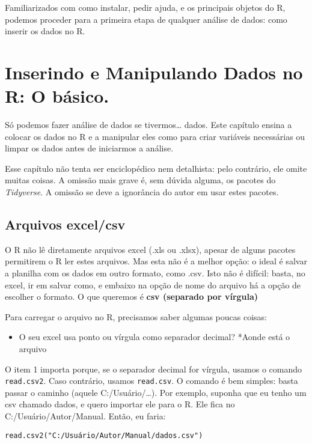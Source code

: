 \documentclass[]{book}
\providecommand{\tightlist}{%
  \setlength{\itemsep}{0pt}\setlength{\parskip}{0pt}}
\begin{document}
Familiarizados com como instalar, pedir ajuda, e os principais objetos
do R, podemos proceder para a primeira etapa de qualquer análise de
dados: como inserir os dados no R.

\chapter{Inserindo e Manipulando Dados no R: O
básico.}\label{inserindo-e-manipulando-dados-no-r-o-basico.}

Só podemos fazer análise de dados se tivermos\ldots{} dados. Este
capítulo ensina a colocar os dados no R e a manipular eles como para
criar variáveis necessárias ou limpar os dados antes de iniciarmos a
análise.

Esse capítulo não tenta ser enciclopédico nem detalhista: pelo
contrário, ele omite muitas coisas. A omissão mais grave é, sem dúvida
alguma, os pacotes do \emph{Tidyverse}. A omissão se deve a ignorância
do autor em usar estes pacotes.

\section{Arquivos excel/csv}\label{arquivos-excelcsv}

O R não lê diretamente arquivos excel (.xls ou .xlsx), apesar de alguns
pacotes permitirem o R ler estes arquivos. Mas esta não é a melhor
opção: o ideal é salvar a planilha com os dados em outro formato, como
.csv. Isto não é difícil: basta, no excel, ir em salvar como, e embaixo
na opção de nome do arquivo há a opção de escolher o formato. O que
queremos é \textbf{csv (separado por vírgula)}

Para carregar o arquivo no R, precisamos saber algumas poucas coisas:

\begin{itemize}
\tightlist
\item
  O seu excel usa ponto ou vírgula como separador decimal? *Aonde está o
  arquivo
\end{itemize}

O item 1 importa porque, se o separador decimal for vírgula, usamos o
comando \texttt{read.csv2}. Caso contrário, usamos \texttt{read.csv}. O
comando é bem simples: basta passar o caminho (aquele
C:/Usuário/\ldots{}). Por exemplo, suponha que eu tenho um csv chamado
dados, e quero importar ele para o R. Ele fica no
C:/Usuário/Autor/Manual. Então, eu faria:

\begin{verbatim}
read.csv2("C:/Usuário/Autor/Manual/dados.csv")
\end{verbatim}
\end{document}
